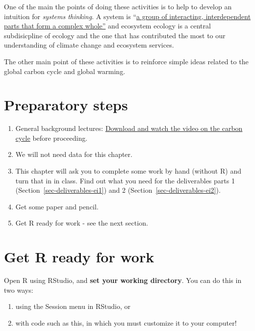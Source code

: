 \documentclass[
  letterpaper,
  DIV=11,
  numbers=noendperiod]{scrreprt}
\providecommand{\tightlist}{%
  \setlength{\itemsep}{0pt}\setlength{\parskip}{0pt}}
\begin{document}
One of the main the points of doing these activities is to help to
develop an intuition for \emph{systems thinking}. A system is
``\href{https://en.wikipedia.org/wiki/Systems_theory}{a group of
interacting, interdependent parts that form a complex whole''} and
ecosystem ecology is a central subdisicpline of ecology and the one that
has contributed the most to our understanding of climate change and
ecosystem services.

The other main point of these activities is to reinforce simple ideas
related to the global carbon cycle and global warming.

\section{Preparatory steps}\label{preparatory-steps-9}

\begin{enumerate}
\def\labelenumi{\arabic{enumi}.}
\tightlist
\item
  General background lectures:
  \href{https://drive.google.com/drive/folders/1nWLoEGuWKIWdul9Uvse5qiB1Hf8MCwUv?usp=sharing}{Download
  and watch the video on the carbon cycle} before proceeding.
\item
  We will not need data for this chapter.
\item
  This chapter will ask you to complete some work by hand (without R)
  and turn that in in class. Find out what you need for the deliverables
  parts 1 (Section~\ref{sec-deliverables-ei1}) and 2
  (Section~\ref{sec-deliverables-ei2}).
\item
  Get some paper and pencil.
\item
  Get R ready for work - see the next section.
\end{enumerate}

\section{Get R ready for work}\label{get-r-ready-for-work}

Open R using RStudio, and \textbf{set your working directory}. You can
do this in two ways:

\begin{enumerate}
\def\labelenumi{\arabic{enumi}.}
\tightlist
\item
  using the Session menu in RStudio, or
\item
  with code such as this, in which you must customize it to your
  computer!
\end{enumerate}
\end{document}
